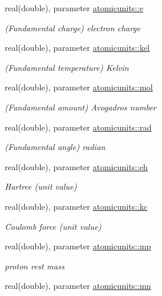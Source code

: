 \begin{DoxyCompactItemize}
real(double), parameter \hyperlink{namespaceatomicunits_af3650eaf423c8af5e887256a5e8023d6}{atomicunits\+::e}
\begin{DoxyCompactList}\small\item\em (Fundamental charge) electron charge \end{DoxyCompactList}\item 
real(double), parameter \hyperlink{namespaceatomicunits_a0b4d6ac453558bc86022587236f7d076}{atomicunits\+::kel}
\begin{DoxyCompactList}\small\item\em (Fundamental temperature) Kelvin \end{DoxyCompactList}\item 
real(double), parameter \hyperlink{namespaceatomicunits_af00d60f8fc301784d6e48a53e524a4c8}{atomicunits\+::mol}
\begin{DoxyCompactList}\small\item\em (Fundamental amount) Avogadro\textquotesingle{}s number \end{DoxyCompactList}\item 
real(double), parameter \hyperlink{namespaceatomicunits_a07ac069b1a5417fd61aa3954d6b66d83}{atomicunits\+::rad}
\begin{DoxyCompactList}\small\item\em (Fundamental angle) radian \end{DoxyCompactList}\item 
real(double), parameter \hyperlink{namespaceatomicunits_a39b85d20ed96ab0b9dfb86c7646a61a0}{atomicunits\+::eh}
\begin{DoxyCompactList}\small\item\em Hartree (unit value) \end{DoxyCompactList}\item 
real(double), parameter \hyperlink{namespaceatomicunits_aafc175708d34f52459448530cdec9aae}{atomicunits\+::kc}
\begin{DoxyCompactList}\small\item\em Coulomb force (unit value) \end{DoxyCompactList}\item 
real(double), parameter \hyperlink{namespaceatomicunits_a62f37608529c74a442a81baa515965d6}{atomicunits\+::mp}
\begin{DoxyCompactList}\small\item\em proton rest mass \end{DoxyCompactList}\item 
real(double), parameter \hyperlink{namespaceatomicunits_a001e0a01ab152644eb7df31ade44b290}{atomicunits\+::mn}

\end{DoxyCompactItemize}
